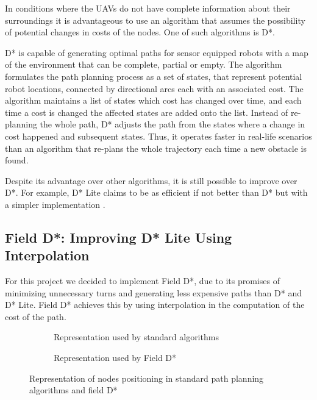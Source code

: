In conditions where the UAVs do not have complete information about their surroundings it is 
advantageous to use an algorithm that assumes the possibility of potential changes in costs of the nodes. 
One of such algorithms is D*. 

D* is capable of generating optimal paths for sensor equipped robots with a map of the environment that 
can be complete, partial or empty. The algorithm formulates the path planning process as a set of states,
that represent potential robot locations, connected by directional arcs each with an associated cost. The 
algorithm maintains a list of states which cost has changed over time, and each time a cost is changed
the affected states are added onto the list. Instead of re-planning the whole path, D* adjusts the path
from the states where a change in cost happened and subsequent states. Thus, it operates faster in real-life
scenarios than an algorithm that re-plans the whole trajectory each time a new obstacle is found. \autocite{AS94}

Despite its advantage over other algorithms, it is still possible to improve over D*. For example, D* Lite 
claims to be as efficient if not better than D* but with a simpler implementation \autocite{SK05}.

\subsection{Field D*: Improving D* Lite Using Interpolation}

For this project we decided to implement Field D*, due to its promises of minimizing unnecessary turns and
generating less expensive paths than D* and D* Lite. Field D* achieves this by using interpolation in the 
computation of the cost of the path. \autocite{DF06}

\begin{figure}
	\begin{center}
		\begin{subfigure}{0.5\textwidth}\centering
			
			\caption{Representation used by standard algorithms}\label{fig:fds-cell-1}
		\end{subfigure}
		\begin{subfigure}{0.4\textwidth}\centering
			
			\caption{Representation used by Field D*}\label{fig:fds-cell-2}
		\end{subfigure}
	\end{center}
	\caption{Representation of nodes positioning in standard path planning algorithms and field D*}\label{fig:fds-cell}
\end{figure}


